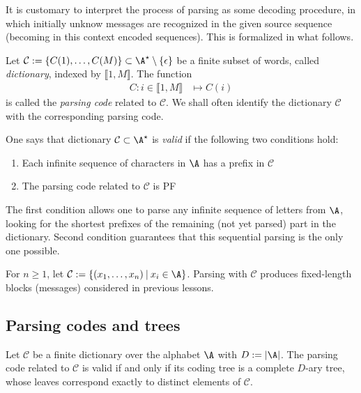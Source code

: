 \documentclass[toc]{../cs-classes/cs-classes}
\begin{document}
It is customary to interpret the process of parsing as some decoding procedure, in which initially unknow messages are recognized in the given source sequence (becoming in this  context encoded sequences). This is formalized in what follows.

\begin{definition}
    Let $\mathcal{C} := \{C(1), \dots, C(M)\} \subset \A^\star\setminus\{\epsilon\}$ be a finite subset of words, called \emph{dictionary}, indexed by $\llbracket 1, M\rrbracket$. The function
    \begin{equation*}
        \begin{aligned}
            C : i\in \llbracket 1, M\rrbracket &\mapsto C(i)
        \end{aligned}
    \end{equation*}
    is called the \emph{parsing code} related to $\mathcal{C}$. We shall often identify the dictionary $\mathcal{C}$ with the corresponding parsing code.
\end{definition}

\begin{definition}
    One says that dictionary $\mathcal{C} \subset \A^\star$ is \emph{valid} if the following two conditions hold:
    \begin{enumerate}
        \item Each infinite sequence of characters in $\A$ has a prefix in $\mathcal{C}$
        \item The parsing code related to $\mathcal{C}$ is PF
    \end{enumerate}
\end{definition}
The first condition allows one to parse any infinite sequence of letters from $\A$, looking for the shortest prefixes of the remaining (not yet parsed) part in the dictionary. Second condition guarantees that this sequential parsing is the only one possible.

\begin{example}
    For $n\geq1$, let $\mathcal{C} := \{(x_1, \dots, x_n) \: | \: x_i \in \A\}$. Parsing with $\mathcal{C}$ produces fixed-length blocks (messages) considered in previous lessons.
\end{example}

\subsection{Parsing codes and trees}
\begin{lemma}
    Let $\mathcal{C}$ be a finite dictionary over the alphabet $\A$ with $D:=|\A|$. The parsing code related to $\mathcal{C}$ is valid if and only if its coding tree is a complete $D$-ary tree, whose leaves correspond exactly to distinct elements of $\mathcal{C}$.
\end{lemma}
\end{document}
